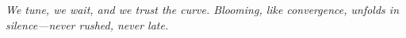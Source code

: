 \motto
\begin{centering}
\vfill
\emph{We tune, we wait, and we trust the curve. Blooming, like convergence, unfolds in silence—never rushed, never late.\\[.6cm]}
\vfill
\end{centering}
